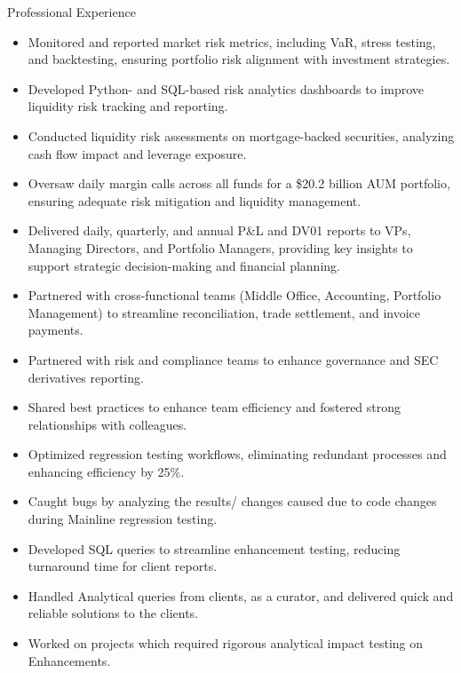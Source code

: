 \documentclass{resume}
\begin{document}
\begin{experienceSection}{Professional Experience}
    \experienceItem[
        position={Analyst- Analytics/ IRRM},
        location={San Jose, CA},
        company={Bayview Asset Management},
        duration={Aug 2022 – Present}
    ]
    \begin{itemize}
        \itemsep -6pt {}
        \item Monitored and reported market risk metrics, including VaR, stress testing, and backtesting, ensuring portfolio risk alignment with investment strategies.
        \item Developed Python- and SQL-based risk analytics dashboards to improve liquidity risk tracking and reporting.
         \item Conducted liquidity risk assessments on mortgage-backed securities, analyzing cash flow impact and leverage exposure. 
        \item Oversaw daily margin calls across all funds for a \$20.2 billion AUM portfolio, ensuring adequate risk mitigation and liquidity management. 
        \item Delivered daily, quarterly, and annual P\&L and  DV01 reports to VPs, Managing Directors, and Portfolio Managers, providing key insights to support strategic decision-making and financial planning.
        \item Partnered with cross-functional teams (Middle Office, Accounting, Portfolio Management) to streamline reconciliation, trade settlement, and invoice payments. 
        \item Partnered with risk and compliance teams to enhance governance and SEC derivatives reporting.
        \item Shared best practices to enhance team efficiency and fostered strong relationships with colleagues.      
    \end{itemize}

    \experienceItem[
        position={Senior Product Analyst},
        location={Telangana, India},
        company={FactSet},
        duration={Jan 2020 – Aug 2021}
    ]
    \begin{itemize}
        \itemsep -6pt {}
        \item  Optimized regression testing workflows, eliminating redundant processes and enhancing efficiency by 25\%.
        \item Caught bugs by analyzing the results/ changes caused due to code changes during Mainline regression testing.
        \item Developed SQL queries to streamline enhancement testing, reducing turnaround time for client reports.
        \item Handled Analytical queries from clients, as a curator, and delivered quick and reliable solutions to the clients.
        \item Worked on projects which required rigorous analytical impact testing on Enhancements.
    \end{itemize}


\end{experienceSection}
\end{document}
